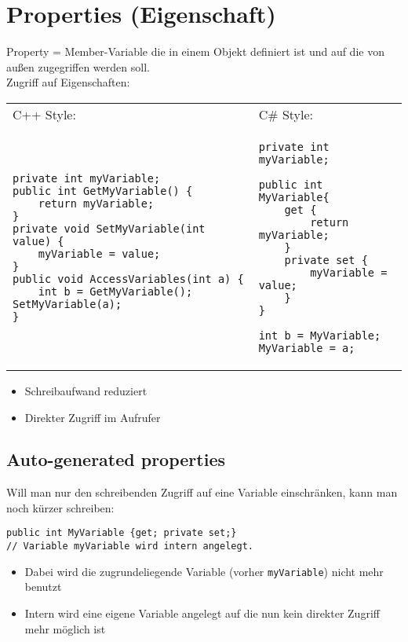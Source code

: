 \section{Properties (Eigenschaft)}
Property = Member-Variable die in einem Objekt definiert ist und auf die von außen zugegriffen werden soll.\\
Zugriff auf Eigenschaften: \\
\begin{tabular}{L{.5} L{.5}}
C++ Style: &  C\# Style:\\
\vspace*{-1.5em}
\begin{lstlisting}[language={[Sharp]C}]
private int myVariable;
public int GetMyVariable() {
	return myVariable;
}
private void SetMyVariable(int value) {
	myVariable = value;
}
public void AccessVariables(int a) {
	int b = GetMyVariable(); SetMyVariable(a);
} 
\end{lstlisting} &
\vspace*{-1.5em}
\begin{lstlisting}[language={[Sharp]C}]
private int myVariable;

public int MyVariable{
	get {
		return myVariable;
	}
	private set {
		myVariable = value;
	}
}

int b = MyVariable;
MyVariable = a;
\end{lstlisting}
\end{tabular}\vspace*{-1.5em}
\begin{itemize}
\item Schreibaufwand reduziert
\item Direkter Zugriff im Aufrufer
\end{itemize}

\subsection{Auto-generated properties}
Will man nur den schreibenden Zugriff auf eine Variable einschränken, kann man noch kürzer schreiben:
\begin{lstlisting}[language={[Sharp]C}]
public int MyVariable {get; private set;}
// Variable myVariable wird intern angelegt.
\end{lstlisting}
\begin{itemize}
\item Dabei wird die zugrundeliegende Variable (vorher \lstinline$myVariable$) nicht mehr benutzt
\item Intern wird eine eigene Variable angelegt auf die nun kein direkter Zugriff mehr möglich ist
\end{itemize}

